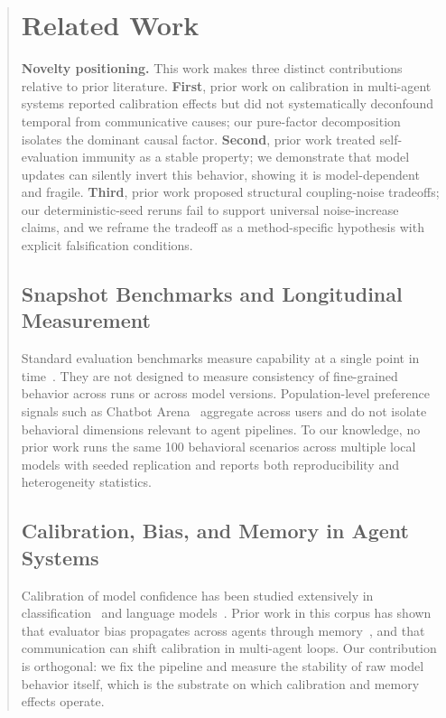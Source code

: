 \documentclass[11pt]{article}
\begin{document}
\begin{abstract}
\section{Related Work}
\textbf{Novelty positioning.} This work makes three distinct contributions relative to prior literature. \textbf{First}, prior work on calibration in multi-agent systems reported calibration effects but did not systematically deconfound temporal from communicative causes; our pure-factor decomposition isolates the dominant causal factor. \textbf{Second}, prior work treated self-evaluation immunity as a stable property; we demonstrate that model updates can silently invert this behavior, showing it is model-dependent and fragile. \textbf{Third}, prior work proposed structural coupling-noise tradeoffs; our deterministic-seed reruns fail to support universal noise-increase claims, and we reframe the tradeoff as a method-specific hypothesis with explicit falsification conditions.


\label{sec:related}

\subsection{Snapshot Benchmarks and Longitudinal Measurement}

Standard evaluation benchmarks measure capability at a single point in
time~\citep{hendrycks2021mmlu,liang2022helm,chen2021humaneval}. They are
not designed to measure consistency of fine-grained behavior across runs or
across model versions. Population-level preference signals such as Chatbot
Arena~\citep{chiang2024chatbot} aggregate across users and do not isolate
behavioral dimensions relevant to agent pipelines. To our knowledge, no
prior work runs the same 100 behavioral scenarios across multiple local
models with seeded replication and reports both reproducibility and
heterogeneity statistics.

\subsection{Calibration, Bias, and Memory in Agent Systems}

Calibration of model confidence has been studied extensively in
classification~\citep{guo2017calibration} and language
models~\citep{kadavath2022language}. Prior work in this corpus has shown
that evaluator bias propagates across agents through
memory~\citep{liu2026memorycontagion}, and that communication can shift
calibration in multi-agent loops. Our contribution is orthogonal: we fix
the pipeline and measure the stability of raw model behavior itself, which
is the substrate on which calibration and memory effects operate.


\end{abstract}
\end{document}
